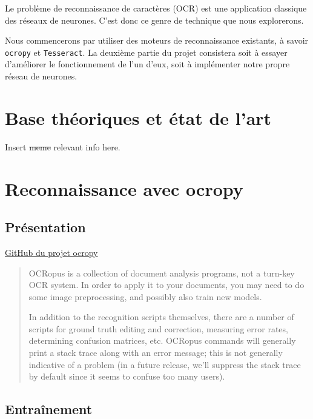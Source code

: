 \documentclass{article}
\begin{document}
Le problème de reconnaissance de caractères (OCR) est une application classique des réseaux de neurones. C'est donc ce genre de technique que nous explorerons.

Nous commencerons par utiliser des moteurs de reconnaissance existants, à savoir \texttt{ocropy} et \texttt{Tesseract}. La deuxième partie du projet consistera soit à essayer d'améliorer le fonctionnement de l'un d'eux, soit à implémenter notre propre réseau de neurones. 


\section{Base théoriques et état de l'art}

Insert \sout{meme} relevant info here.


\section{Reconnaissance avec ocropy}

\subsection{Présentation}

\href{https://github.com/tmbdev/ocropy}{GitHub du projet ocropy}

\begin{quotation}
    OCRopus is a collection of document analysis programs, not a turn-key OCR system. In order to apply it to your documents, you may need to do some image preprocessing, and possibly also train new models.

    In addition to the recognition scripts themselves, there are a number of scripts for ground truth editing and correction, measuring error rates, determining confusion matrices, etc. OCRopus commands will generally print a stack trace along with an error message; this is not generally indicative of a problem (in a future release, we'll suppress the stack trace by default since it seems to confuse too many users).
\end{quotation}

\subsection{Entraînement}
\end{document}
